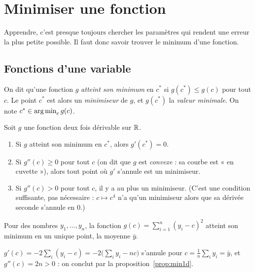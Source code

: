 \section{Minimiser une fonction}
\label{sec:optimisation}

Apprendre, c'est presque toujours chercher les paramètres qui rendent une erreur la plus petite possible. Il faut donc savoir trouver le minimum d'une fonction.

\subsection{Fonctions d'une variable}

\begin{definition}
\label{def:minimum}
On dit qu'une fonction $g$ \emph{atteint son minimum} en $c^*$ si $g(c^*)\le g(c)$ pour tout $c$.
Le point $c^*$ est alors un \emph{minimiseur} de $g$, et $g(c^*)$ la \emph{valeur minimale}. On note $c^*\in\operatorname*{arg\,min}_cg(c)$.
\end{definition}

\begin{proposition}
\label{prop:min1d}
Soit $g$ une fonction deux fois dérivable sur $\mathbb{R}$.
\begin{enumerate}[label=(\roman*)]
  \item Si $g$ atteint son minimum en $c^*$, alors $g'(c^*)=0$.
  \item Si $g''(c)\ge0$ pour tout $c$ (on dit que $g$ est \emph{convexe} : sa courbe est « en cuvette »), alors tout point où $g'$ s'annule est un minimiseur.
  \item Si $g''(c)>0$ pour tout $c$, il y a au plus un minimiseur. (C'est une condition suffisante, pas nécessaire : $c\mapsto c^4$ n'a qu'un minimiseur alors que sa dérivée seconde s'annule en $0$.)
\end{enumerate}
\end{proposition}

\begin{proposition}
\label{prop:moyenne}
Pour des nombres $y_1,\dots,y_n$, la fonction $g(c)=\sum_{i=1}^n(y_i-c)^2$ atteint son minimum en un unique point, la moyenne $\bar y$.
\end{proposition}
\begin{preuve}
$g'(c)=-2\sum_i(y_i-c)=-2\big(\sum_iy_i-nc\big)$ s'annule pour $c=\frac1n\sum_iy_i=\bar y$, et $g''(c)=2n>0$ : on conclut par la proposition~\ref{prop:min1d}.
\end{preuve}

